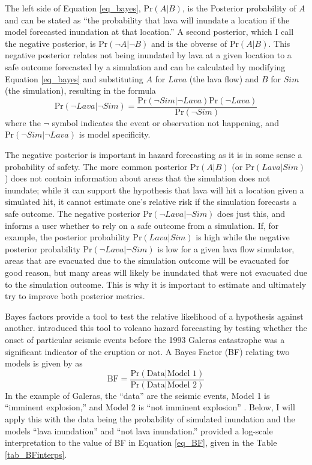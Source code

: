 	The left side of Equation \ref{eq_bayes}, $\text{Pr}(A|B)$, is the Posterior probability of $A$ and can be stated as ``the probability that lava will inundate a location if the model forecasted inundation at that location.'' A second posterior, which I call the negative posterior, is $\text{Pr}(\neg A|\neg B)$ and is the obverse of $\text{Pr}(A|B)$. This negative posterior relates not being inundated by lava at a given location to a safe outcome forecasted by a simulation and can be calculated by modifying Equation \ref{eq_bayes} and substituting $A$ for $Lava$ (the lava flow) and $B$ for $Sim$ (the simulation), resulting in the formula
	\begin{equation}
		\text{Pr}(\neg Lava|\neg Sim)=\frac{\text{Pr}(\neg Sim|\neg Lava)\text{Pr}(\neg Lava)}{\text{Pr}(\neg Sim)}
	\end{equation}
	where the $\neg$ symbol indicates the event or observation not happening, and $\text{Pr}(\neg Sim|\neg Lava)$ is model specificity.
	
	The negative posterior is important in hazard forecasting as it is in some sense a probability of safety. The more common posterior $\text{Pr}(A|B)$ (or $\text{Pr}(Lava|Sim)$) does not contain information about areas that the simulation does not inundate; while it can support the hypothesis that lava will hit a location given a simulated hit, it cannot estimate one's relative risk if the simulation forecasts a safe outcome. The negative posterior $\text{Pr}(\neg Lava|\neg Sim)$ does just this, and informs a user whether to rely on a safe outcome from a simulation. If, for example, the posterior probability $\text{Pr}(Lava|Sim)$ is high while the negative posterior probability $\text{Pr}(\neg Lava|\neg Sim)$ is low for a given lava flow simulator, areas that are evacuated due to the simulation outcome will be evacuated for good reason, but many areas will likely be inundated that were not evacuated due to the simulation outcome. This is why it is important to estimate and ultimately try to improve both posterior metrics.
	
	Bayes factors provide a tool to test the relative likelihood of a hypothesis against another. \citet{aspinall2003evidence} introduced this tool to volcano hazard forecasting by testing whether the onset of particular seismic events before the 1993 Galeras catastrophe was a significant indicator of the eruption or not. A Bayes Factor (BF) relating two models is given by \citet{jeffreys1998theory} as
	\begin{equation}
		\text{BF} = \frac{\text{Pr}(\text{Data}|\text{Model~1})}{\text{Pr}(\text{Data}|\text{Model~2})}
		\label{eq_BF}
	\end{equation}
	In the example of Galeras, the ``data'' are the seismic events, Model 1 is ``imminent explosion,'' and Model 2 is ``not imminent explosion'' \citep{aspinall2003evidence}. Below, I will apply this with the data being the probability of simulated inundation and the models ``lava inundation'' and ``not lava inundation.'' \citet{jeffreys1998theory} provided a log-scale interpretation to the value of BF in Equation \ref{eq_BF}, given in the Table \ref{tab_BFinterps}.
	
